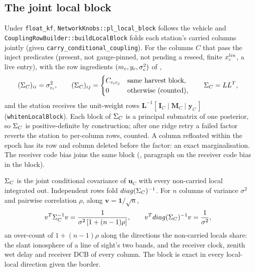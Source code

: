 \documentclass[main.tex]{subfiles}
\begin{document}
\subsection{The joint local block}
\label{sec:net-vehicle-block}

Under \texttt{float\_kf}, \texttt{NetworkKnobs::pl\_local\_block} follows
the vehicle and \texttt{CouplingRowBuilder::buildLocalBlock} folds each
station's carried columns jointly (given
\texttt{carry\_conditional\_coupling}). For the columns $C$ that pass the
inject predicates (present, not gauge-pinned, not pending a reseed, finite
$x^{lin}_{c}$, a live entry), with the row ingredients $(m_{c}, y_c,
\sigma_c^2)$ of ,
\begin{equation}
(\Sigma_{C})_{ii} = \sigma_{c_i}^2,
\qquad
(\Sigma_{C})_{ij} =
\begin{cases}
C_{c_ic_j} & \text{same harvest block},\\
0 & \text{otherwise (counted)},
\end{cases}
\qquad
\Sigma_{C} = LL^{T},
\label{eq:veh-block}
\end{equation}
and the station receives the unit-weight rows
$\bm{L}^{-1}[\,\bm{I}_C \mid \bm{M}_C \mid \bm{y}_C\,]$
(\texttt{whitenLocalBlock}). Each block of $\Sigma_{C}$ is a principal
submatrix of one posterior, so $\Sigma_{C}$ is positive-definite by
construction; after one ridge retry a failed factor reverts the station to
per-column rows, counted. A column refloated within the epoch has its row
and column deleted before the factor: an exact marginalisation. The
receiver code bias joins the same block (,
paragraph on the receiver code bias in the block).

$\Sigma_{C}$ is the joint conditional covariance of $\bm{u}_C$ with every
non-carried local integrated out. Independent rows fold
$diag(\Sigma_{C})^{-1}$. For $n$ columns of variance $\sigma^2$ and
pairwise correlation $\rho$, along $\bm{v} = \bm{1}/\sqrt{n}$,
\begin{equation}
v^{T}\Sigma_{C}^{-1}v = \frac{1}{\sigma^2\,[1+(n-1)\rho]},
\qquad
v^{T}diag(\Sigma_{C})^{-1}v = \frac{1}{\sigma^2},
\label{eq:veh-overcount}
\end{equation}
an over-count of $1+(n-1)\rho$ along the directions the non-carried locals
share: the slant ionosphere of a line of sight's two bands, and the
receiver clock, zenith wet delay and receiver DCB of every column. The
block is exact in every local-local direction given the border.
\end{document}
